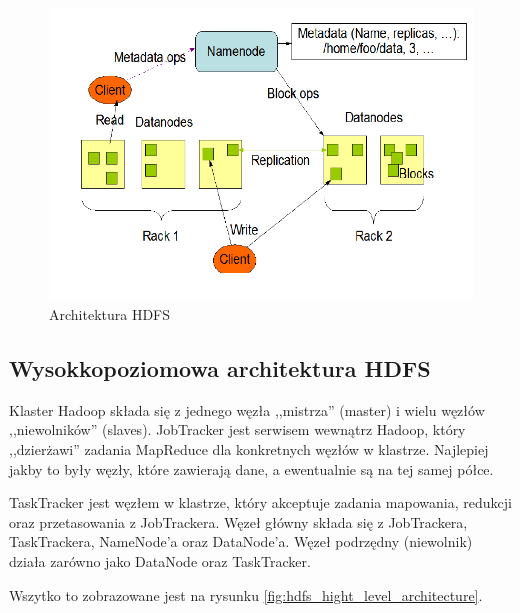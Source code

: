 \documentclass[10pt,twocolumn]{llncs}          %
\begin{document}
\begin{figure}
    \centerline{\includegraphics[scale=0.4]{obrazki/HDFS_architecture.png}}
    \caption{Architektura HDFS}
    \label{fig:hdfs_architecture}       %
\end{figure}

\subsection{Wysokkopoziomowa architektura HDFS}
\label{ssub:hdfs_high_level_architecture}
Klaster Hadoop składa się z jednego węzła ,,mistrza'' (master) i wielu węzłów ,,niewolników'' (slaves). JobTracker jest serwisem wewnątrz Hadoop, który ,,dzierżawi'' zadania MapReduce dla konkretnych węzłów w klastrze. Najlepiej jakby to były węzły, które zawierają dane, a ewentualnie są na tej samej półce.

TaskTracker jest węzłem w klastrze, który akceptuje zadania mapowania, redukcji oraz przetasowania z JobTrackera. Węzeł główny składa się z JobTrackera, TaskTrackera, NameNode'a oraz DataNode'a. Węzeł podrzędny (niewolnik) działa zarówno jako DataNode oraz TaskTracker.

Wszytko to zobrazowane jest na rysunku \ref{fig:hdfs_hight_level_architecture}.
\end{document}
